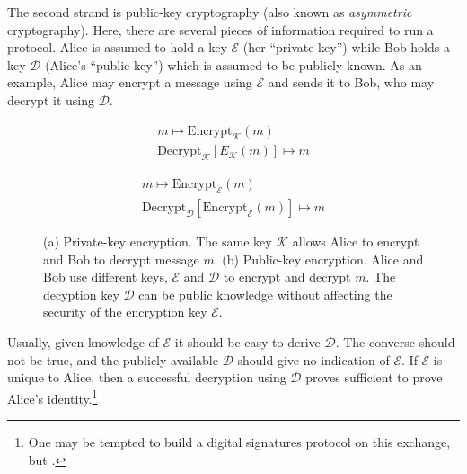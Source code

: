 

The second strand is public-key cryptography (also known as \emph{asymmetric} cryptography). Here, there are several pieces of information required to run a protocol. Alice is assumed to hold a key $\mathcal{E}$ (her ``private key'') while Bob holds a key $\mathcal{D}$ (Alice's ``public-key'') which is assumed to be publicly known. As an example, Alice may encrypt a message using $\mathcal{E}$ and sends it to Bob, who may decrypt it using $\mathcal{D}$.  

\begin{figure}[htp]
\centering
\captionsetup{width=0.8\linewidth}
\begin{framed}
\begin{subfigure}{0.4\textwidth}
\begin{align*}
m \mapsto \text{Encrypt}_\mathcal{K}\left(m\right) \\
\text{Decrypt}_\mathcal{K}\left[E_\mathcal{K}\left(m\right)\right] \mapsto m
\end{align*}
\caption{}
\end{subfigure}
\begin{subfigure}{0.4\textwidth}
\begin{align*}
m \mapsto \text{Encrypt}_\mathcal{E}\left(m\right) \\
\text{Decrypt}_\mathcal{D}\left[\text{Encrypt}_\mathcal{E}\left(m\right)\right] \mapsto m
\end{align*}
\caption{}
\end{subfigure}
\caption{(a) Private-key encryption. The same key $\mathcal{K}$ allows Alice to encrypt and Bob to decrypt message $m$. (b) Public-key encryption. Alice and Bob use different keys, $\mathcal{E}$ and $\mathcal{D}$ to encrypt and decrypt $m$. The decyption key $\mathcal{D}$ can be public knowledge without affecting the security of the encryption key $\mathcal{E}$.}
\label{fig:pubpriv}
\end{framed}
\end{figure}

Usually, given knowledge of $\mathcal{E}$ it should be easy to derive $\mathcal{D}$. The converse should not be true, and the publicly available $\mathcal{D}$ should give no indication of $\mathcal{E}$. If $\mathcal{E}$ is unique to Alice, then a successful decryption using $\mathcal{D}$ proves sufficient to prove Alice's identity.\footnote{One may be tempted to build a digital signatures protocol on this exchange, but .}


